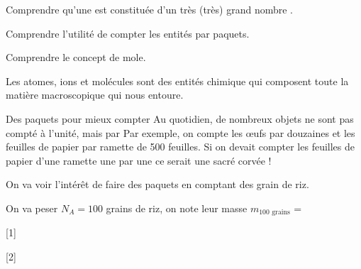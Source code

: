 \teteSndMole

\vspace*{-32pt}


\begin{objectifs}
  \item Comprendre qu'une  est constituée d'un très (très) grand nombre .
  \item Comprendre l'utilité de compter les entités par paquets.
  \item Comprendre le concept de mole.
\end{objectifs}

\begin{contexte}  
  Les atomes, ions et molécules sont des entités chimique qui composent toute la matière macroscopique qui nous entoure.
  
\end{contexte}



\begin{doc}{Des paquets pour mieux compter}
  Au quotidien, de nombreux objets ne sont pas compté à l'unité, mais par 
  Par exemple, on compte les œufs par douzaines et les feuilles de papier par ramette de 500 feuilles.
  Si on devait compter les feuilles de papier d'une ramette une par une ce serait une sacré corvée !

  On va voir l'intérêt de faire des paquets en comptant des grain de riz.
\end{doc}

\mesure On va peser $N_A = 100$ grains de riz, on note leur masse $m_\text{100 grains}$ = 

[1]

[2]

